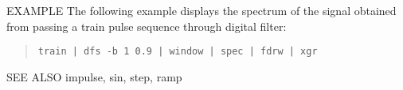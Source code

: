 \begin{options}
\end{options}

\begin{qsection}{EXAMPLE}
The following example displays the spectrum of
the signal obtained from passing a train pulse sequence through
digital filter:
\begin{quote}
\verb!train | dfs -b 1 0.9 | window | spec | fdrw | xgr!
\end{quote}
\end{qsection}

\begin{qsection}{SEE ALSO}
  impulse, sin, step, ramp
\end{qsection}


